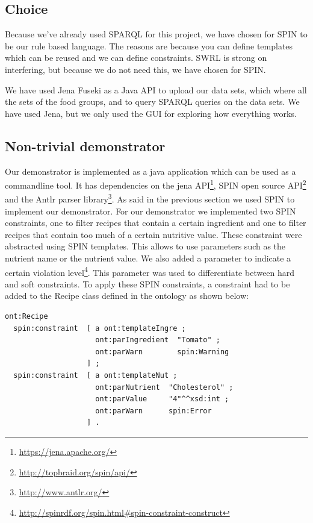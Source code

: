 \subsection*{Choice}
Because we've already used SPARQL for this project, we have chosen for SPIN to be our rule based language. The reasons are because you can define templates which can be reused and we can define constraints. SWRL is strong on interfering, but because we do not need this, we have chosen for SPIN.

We have used Jena Fuseki as a Java API to upload our data sets, which where all the sets of the food groups, and to query SPARQL queries on the data sets. We have used Jena, but we only used the GUI for exploring how everything works. 

\subsection{Non-trivial demonstrator}
Our demonstrator is implemented as a java application which can be used as a commandline tool. It has dependencies on the jena API\footnote{\url{https://jena.apache.org/}}, SPIN open source API\footnote{\url{http://topbraid.org/spin/api/}} and the Antlr parser library\footnote{\url{http://www.antlr.org/}}. As said in the previous section we used SPIN to implement our demonstrator. For our demonstrator we implemented two SPIN constraints, one to filter recipes that contain a certain ingredient and one to filter recipes that contain too much of a certain nutritive value. These constraint were abstracted using SPIN templates. This allows to use parameters such as the nutrient name or the nutrient value. We also added a parameter to indicate a certain violation level\footnote{\url{http://spinrdf.org/spin.html\#spin-constraint-construct}}. This parameter was used to differentiate between hard and soft constraints. To apply these SPIN constraints, a constraint had to be added to the Recipe class defined in the ontology as shown below:
\begin{lstlisting}[caption=Example of applying constraints in turtle]
ont:Recipe  
  spin:constraint  [ a ont:templateIngre ;
                     ont:parIngredient  "Tomato" ;
                     ont:parWarn        spin:Warning
                   ] ;
  spin:constraint  [ a ont:templateNut ;
                     ont:parNutrient  "Cholesterol" ;
                     ont:parValue     "4"^^xsd:int ;
                     ont:parWarn      spin:Error
                   ] .
\end{lstlisting} 
